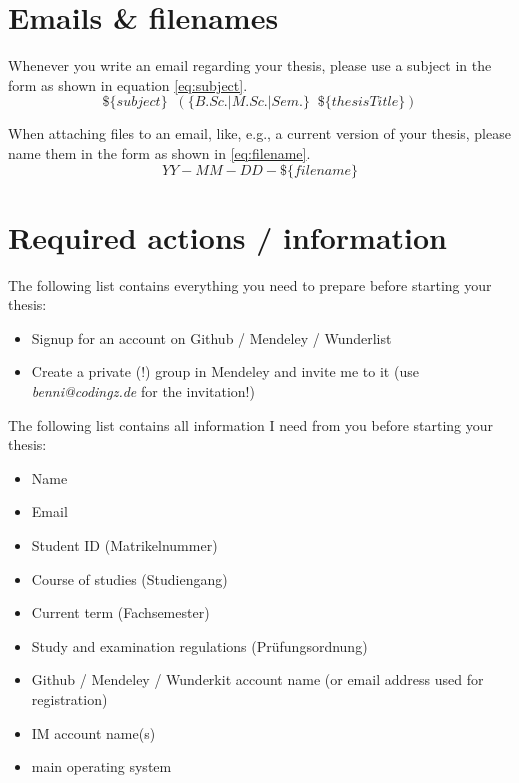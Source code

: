 \documentclass{article}
\begin{document}
\section{Emails \& filenames}

Whenever you write an email regarding your thesis, please use a subject in the form as shown in equation \ref{eq:subject}.
\begin{equation} \label{eq:subject}
	\$\{subject\} \;\; (\{B.Sc. | M.Sc. | Sem.\} \;\; \$\{thesisTitle\})
\end{equation}

When attaching files to an email, like, e.g., a current version of your thesis, please name them in the form as shown in \ref{eq:filename}.
\begin{equation} \label{eq:filename}
	YY\!\!-\!\!MM\!\!-\!\!DD\!-\!\$\{filename\}
\end{equation}










\section{Required actions / information}

The following list contains everything you need to prepare before starting your thesis:

\begin{itemize}
	\item Signup for an account on Github / Mendeley / Wunderlist
	\item Create a private (!) group in Mendeley and invite me to it (use \emph{benni@codingz.de} for the invitation!)
\end{itemize}

The following list contains all information I need from you before starting your thesis:

\begin{itemize}
	\item Name
	\item Email
	\item Student ID (Matrikelnummer)
	\item Course of studies (Studiengang)
	\item Current term (Fachsemester)
	\item Study and examination regulations (Pr\"{u}fungsordnung)
	\item Github / Mendeley / Wunderkit account name (or email address used for registration)
	\item IM account name(s)
	\item main operating system
\end{itemize}
\end{document}
